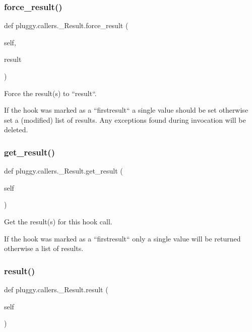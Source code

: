 \subsubsection{\texorpdfstring{force\+\_\+result()}{force\_result()}}
{\footnotesize\ttfamily def pluggy.\+callers.\+\_\+\+Result.\+force\+\_\+result (\begin{DoxyParamCaption}\item[{}]{self,  }\item[{}]{result }\end{DoxyParamCaption})}

\begin{DoxyVerb}Force the result(s) to ``result``.

If the hook was marked as a ``firstresult`` a single value should
be set otherwise set a (modified) list of results. Any exceptions
found during invocation will be deleted.
\end{DoxyVerb}
 \mbox{\label{classpluggy_1_1callers_1_1___result_a518b55f803ba4669e9277cf38d6aa335}} 
\subsubsection{\texorpdfstring{get\+\_\+result()}{get\_result()}}
{\footnotesize\ttfamily def pluggy.\+callers.\+\_\+\+Result.\+get\+\_\+result (\begin{DoxyParamCaption}\item[{}]{self }\end{DoxyParamCaption})}

\begin{DoxyVerb}Get the result(s) for this hook call.

If the hook was marked as a ``firstresult`` only a single value
will be returned otherwise a list of results.
\end{DoxyVerb}
 \mbox{\label{classpluggy_1_1callers_1_1___result_a2dd253e2f46a2acc2e924edec3e63e21}} 
\subsubsection{\texorpdfstring{result()}{result()}}
{\footnotesize\ttfamily def pluggy.\+callers.\+\_\+\+Result.\+result (\begin{DoxyParamCaption}\item[{}]{self }\end{DoxyParamCaption})}

